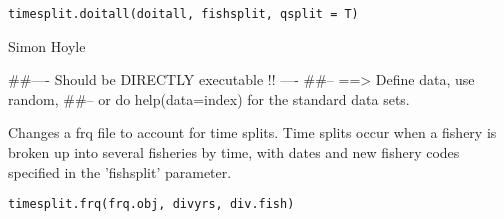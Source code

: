 \documentclass[a4paper]{book}
\begin{document}
%
\begin{Usage}
\begin{verbatim}
timesplit.doitall(doitall, fishsplit, qsplit = T)
\end{verbatim}
\end{Usage}
%
\begin{Arguments}
\begin{ldescription}
\item[\code{doitall}] 


\item[\code{fishsplit}] 


\item[\code{qsplit}] 


\end{ldescription}
\end{Arguments}
%
\begin{Author}\relax

Simon Hoyle
\end{Author}
%
\begin{Examples}
\begin{ExampleCode}
##---- Should be DIRECTLY executable !! ----
##-- ==>  Define data, use random,
##--	or do  help(data=index)  for the standard data sets.

\end{ExampleCode}
\end{Examples}
%
\begin{Description}\relax

Changes a frq file to account for time splits. 
Time splits occur when a fishery is broken up into several fisheries by time, with dates and new fishery codes specified in the 'fishsplit' parameter. 
\end{Description}
%
\begin{Usage}
\begin{verbatim}
timesplit.frq(frq.obj, divyrs, div.fish)
\end{verbatim}
\end{Usage}
%
\begin{Arguments}
\begin{ldescription}
\item[\code{frq.obj}] 


\item[\code{divyrs}] 


\item[\code{div.fish}] 


\end{ldescription}
\end{Arguments}
\end{document}

